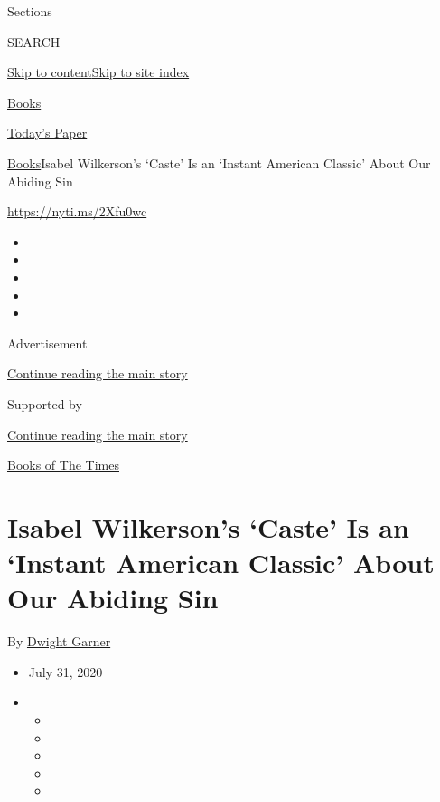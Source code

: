 Sections

SEARCH

\protect\hyperlink{site-content}{Skip to
content}\protect\hyperlink{site-index}{Skip to site index}

\href{https://www.nytimes3xbfgragh.onion/section/books}{Books}

\href{https://myaccount.nytimes3xbfgragh.onion/auth/login?response_type=cookie\&client_id=vi}{}

\href{https://www.nytimes3xbfgragh.onion/section/todayspaper}{Today's
Paper}

\href{/section/books}{Books}\textbar{}Isabel Wilkerson's `Caste' Is an
`Instant American Classic' About Our Abiding Sin

\url{https://nyti.ms/2Xfu0wc}

\begin{itemize}
\item
\item
\item
\item
\item
\end{itemize}

Advertisement

\protect\hyperlink{after-top}{Continue reading the main story}

Supported by

\protect\hyperlink{after-sponsor}{Continue reading the main story}

\href{/column/books-of-the-times}{Books of The Times}

\hypertarget{isabel-wilkersons-caste-is-an-instant-american-classic-about-our-abiding-sin}{%
\section{Isabel Wilkerson's `Caste' Is an `Instant American Classic'
About Our Abiding
Sin}\label{isabel-wilkersons-caste-is-an-instant-american-classic-about-our-abiding-sin}}

By \href{https://www.nytimes3xbfgragh.onion/by/dwight-garner}{Dwight
Garner}

\begin{itemize}
\item
  July 31, 2020
\item
  \begin{itemize}
  \item
  \item
  \item
  \item
  \item
  \end{itemize}
\end{itemize}

